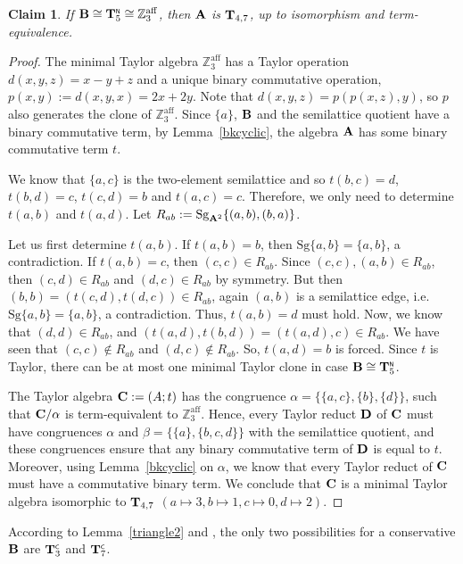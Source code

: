 \documentclass[11pt]{amsart}
\newcommand{\m}[1]{\mathbf{\uppercase{#1}}}
\newcommand{\n}{\scriptscriptstyle{\mathsf{N}}}
\newcommand{\co}{\scriptscriptstyle{\mathsf{C}}}
\theoremstyle{definition}
\theoremstyle{remark}
\theoremstyle{plain}
\newtheorem{claim}[thm]{Claim}
\begin{document}
\begin{claim}
If ${\m B}\cong {\m T}_5^{\n}\cong \mathbb{Z}^{\mathrm{aff}}_3$, then ${\m A}$ is $ {\m T}_{4,7}$, up to isomorphism and term-equivalence.
\end{claim}

\begin{proof}
The minimal Taylor algebra $\mathbb{Z}^{\mathrm{aff}}_3$ has a Taylor operation $d(x,y,z)=x-y+z$ and a unique binary commutative operation, $p(x,y):=d(x,y,x)=2x+2y$. Note that $d(x,y,z)=p(p(x,z),y)$, so $p$ also generates the clone of $\mathbb{Z}^{\mathrm{aff}}_3$. Since $\{a\}$, $\m b$ and the semilattice quotient have a binary commutative term, by Lemma~\ref{bkcyclic}, the algebra $\m A$ has some binary commutative term $t$.

We know that $\{a,c\}$ is the two-element semilattice and so $t(b,c)=d$, $t(b,d)=c$, $t(c,d)=b$ and $t(a,c)=c$. Therefore, we only need to determine $t(a,b)$ and $t(a,d)$. Let $R_{ab}:=\mathrm{Sg}_{\m a^2}\{(a,b),(b,a)\}$. 

Let us first determine $t(a,b)$. If $t(a,b)=b$, then $\mathrm{Sg}\{a,b\}=\{a,b\}$, a contradiction. If $t(a,b)=c$, then $(c,c)\in R_{ab}$. Since $(c,c), (a,b)\in R_{ab}$, then $(c,d)\in R_{ab}$ and $(d,c)\in R_{ab}$ by symmetry. But then $(b,b)=(t(c,d),t(d,c))\in R_{ab}$, again $(a,b)$ is a semilattice edge, i.e. $\mathrm{Sg}\{a,b\}=\{a,b\}$, a contradiction. Thus, $t(a,b)=d$ must hold. Now, we know that $(d,d)\in R_{ab}$, and $(t(a,d),t(b,d))=(t(a,d),c)\in R_{ab}$. We have seen that $(c,c)\not\in R_{ab}$ and $(d,c)\notin R_{ab}$. So, $t(a,d)=b$ is forced. Since $t$ is Taylor, there can be at most one minimal Taylor clone in case ${\m B}\cong {\m T}_5^{\n}$.

The Taylor algebra $\m c:=(A;t)$ has the congruence $\alpha=\{\{a,c\},\{b\},\{d\}\}$, such that ${\m c}/\alpha$ is term-equivalent to $\mathbb{Z}^{\mathrm{aff}}_3$. Hence, every Taylor reduct $\m d$ of $\m c$ must have congruences $\alpha$ and $\beta=\{\{a\},\{b,c,d\}\}$ with the semilattice quotient, and these congruences ensure that any binary commutative term of $\m d$ is equal to $t$. Moreover, using Lemma~\ref{bkcyclic} on $\alpha$, we know that every Taylor reduct of $\m c$ must have a commutative binary term. We conclude that $\m c$ is a minimal Taylor algebra isomorphic to ${\m T}_{4,7}$ $ (a\mapsto 3, b\mapsto 1, c\mapsto 0, d\mapsto 2)$.
\end{proof}

According to Lemma~\ref{triangle2} and , the only two possibilities for a conservative $\m b$ are $\m t_3^{\co}$ and $\m t_7^{\co}$.
\end{document}
